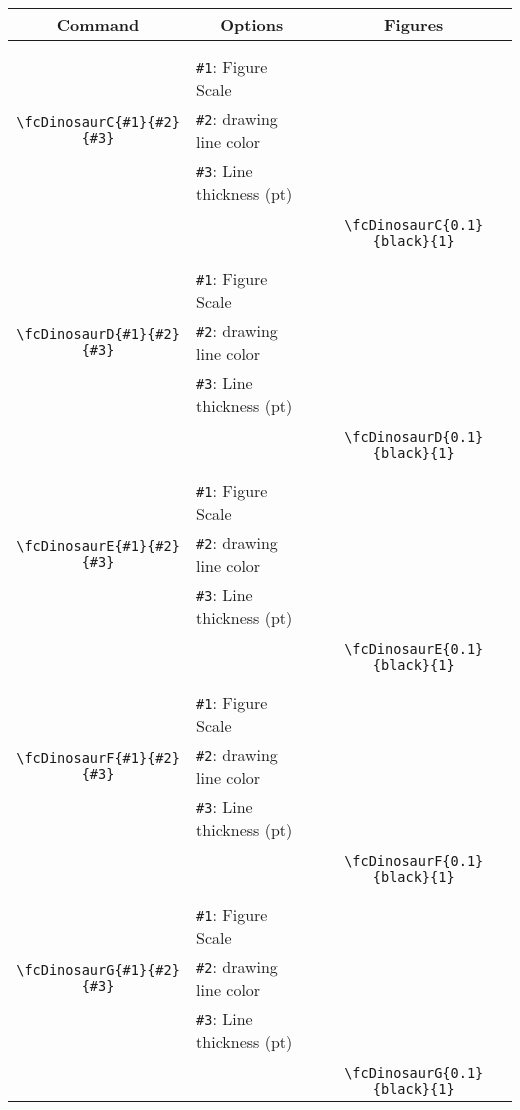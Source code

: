 \documentclass[x11names]{article}
\begin{document}
\begin{table}[H]\centering\begin{tabular}{|c|l|c|}\hline {\bf Command}& \multicolumn{1}{c|}{{\bf Options}} & {\bf Figures}\\  \hline	&&\multirow{5}{*}{\fcDinosaurC{0.1}{black}{1}}\\	&&\\	&\verb|#1|: Figure Scale &\\	\verb|\fcDinosaurC{#1}{#2}{#3}|&	\verb|#2|: drawing line color &\\	&\verb|#3|: Line thickness (pt) &\\ &&\\&&	\verb|\fcDinosaurC{0.1}{black}{1}|\\\hline 	
	&&\multirow{5}{*}{\fcDinosaurD{0.1}{black}{1}}\\	&&\\	&\verb|#1|: Figure Scale &\\	\verb|\fcDinosaurD{#1}{#2}{#3}|&	\verb|#2|: drawing line color &\\	&\verb|#3|: Line thickness (pt) &\\ &&\\&&	\verb|\fcDinosaurD{0.1}{black}{1}|\\\hline 	
	&&\multirow{5}{*}{\fcDinosaurE{0.1}{black}{1}}\\	&&\\	&\verb|#1|: Figure Scale &\\	\verb|\fcDinosaurE{#1}{#2}{#3}|&	\verb|#2|: drawing line color &\\	&\verb|#3|: Line thickness (pt) &\\ &&\\&&	\verb|\fcDinosaurE{0.1}{black}{1}|\\\hline 	
	&&\multirow{5}{*}{\fcDinosaurF{0.1}{black}{1}}\\	&&\\	&\verb|#1|: Figure Scale &\\	\verb|\fcDinosaurF{#1}{#2}{#3}|&	\verb|#2|: drawing line color &\\	&\verb|#3|: Line thickness (pt) &\\ &&\\&&	\verb|\fcDinosaurF{0.1}{black}{1}|\\\hline 	
	&&\multirow{5}{*}{\fcDinosaurG{0.1}{black}{1}}\\	&&\\	&\verb|#1|: Figure Scale &\\	\verb|\fcDinosaurG{#1}{#2}{#3}|&	\verb|#2|: drawing line color &\\	&\verb|#3|: Line thickness (pt) &\\ &&\\&&	\verb|\fcDinosaurG{0.1}{black}{1}|\\\hline 	

\end{tabular}
\end{table}
\end{document}
